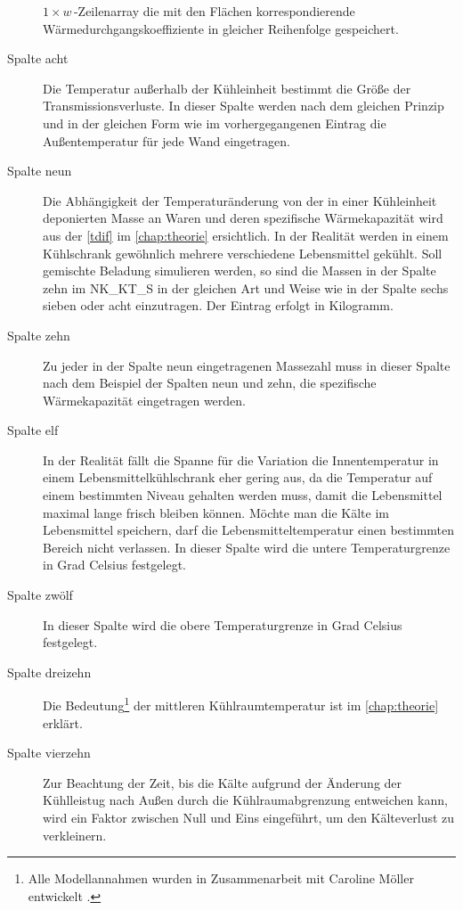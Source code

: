 \begin{description}
	$1\times w\,$-Zeilenarray die mit den Flächen korrespondierende
	Wärmedurchgangskoeffiziente in gleicher Reihenfolge gespeichert.
	\item [{Spalte acht}] Die Temperatur außerhalb der K\"uhleinheit
	bestimmt die Größe der Transmissionsverluste. In dieser Spalte
	werden nach dem gleichen Prinzip und in der gleichen Form wie im
	vorhergegangenen Eintrag die Außentemperatur für jede Wand eingetragen.
	\item [{Spalte neun}] Die Abhängigkeit der Temperaturänderung von der in
	einer K\"uhleinheit deponierten Masse an Waren und deren spezifische
	Wärmekapazität wird aus der \cref{tdif} im \cref{chap:theorie}
	ersichtlich. In der Realität werden in einem Kühlschrank gewöhnlich
	mehrere verschiedene Lebensmittel gekühlt. Soll gemischte Beladung
	simulieren werden, so sind die Massen in der Spalte zehn im NK\_KT\_S in der
	gleichen Art und Weise wie in der Spalte sechs sieben oder acht
	einzutragen. Der Eintrag erfolgt in Kilogramm.
	\item [{Spalte zehn}] Zu jeder in der Spalte neun eingetragenen
	Massezahl muss in dieser Spalte nach dem Beispiel der Spalten neun und
	zehn, die spezifische Wärmekapazität eingetragen werden.
	\item [{Spalte elf}] In der Realität fällt die Spanne für die Variation
	die Innentemperatur in einem Lebensmittelkühlschrank eher gering aus, da
	die Temperatur auf einem bestimmten Niveau gehalten werden muss, damit
	die Lebensmittel maximal lange frisch bleiben können. Möchte man die
	Kälte im Lebensmittel speichern, darf die Lebensmitteltemperatur einen
	bestimmten Bereich nicht verlassen. In dieser Spalte wird die untere
	Temperaturgrenze in Grad Celsius festgelegt.
	\item [{Spalte zw\"olf}] In dieser Spalte wird die obere
	Temperaturgrenze in Grad Celsius festgelegt.
	\item [{Spalte dreizehn}] Die Bedeutung\footnote{ Alle Modellannahmen
	wurden in Zusammenarbeit mit Caroline M\"oller entwickelt \cite{caro}.}
	der mittleren Kühlraumtemperatur ist im \cref{chap:theorie} erkl\"art.
	\item [{Spalte vierzehn}] Zur Beachtung der Zeit, bis die K\"alte
	aufgrund der \"Anderung der K\"uhlleistug nach Au\ss en durch die
	K\"uhlraumabgrenzung entweichen kann, wird ein Faktor zwischen Null
	und Eins eingef\"uhrt, um den K\"alteverlust zu verkleinern.

\end{description}
